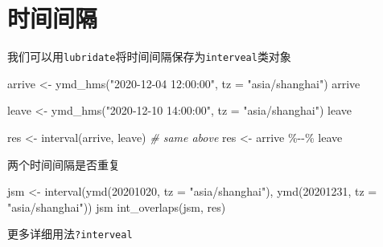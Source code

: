 \documentclass[
]{book}
\newenvironment{Shaded}{\begin{snugshade}}{\end{snugshade}}
\newcommand{\AttributeTok}[1]{\textcolor[rgb]{0.77,0.63,0.00}{#1}}
\newcommand{\CommentTok}[1]{\textcolor[rgb]{0.56,0.35,0.01}{\textit{#1}}}
\newcommand{\DecValTok}[1]{\textcolor[rgb]{0.00,0.00,0.81}{#1}}
\newcommand{\FunctionTok}[1]{\textcolor[rgb]{0.00,0.00,0.00}{#1}}
\newcommand{\NormalTok}[1]{#1}
\newcommand{\OtherTok}[1]{\textcolor[rgb]{0.56,0.35,0.01}{#1}}
\newcommand{\SpecialCharTok}[1]{\textcolor[rgb]{0.00,0.00,0.00}{#1}}
\newcommand{\StringTok}[1]{\textcolor[rgb]{0.31,0.60,0.02}{#1}}
\begin{document}
\hypertarget{ux65f6ux95f4ux95f4ux9694}{%
\section{时间间隔}\label{ux65f6ux95f4ux95f4ux9694}}

我们可以用\texttt{lubridate}将时间间隔保存为\texttt{interveal}类对象

\begin{Shaded}
\begin{Highlighting}[]
\NormalTok{arrive }\OtherTok{\textless{}{-}} \FunctionTok{ymd\_hms}\NormalTok{(}\StringTok{"2020{-}12{-}04 12:00:00"}\NormalTok{, }\AttributeTok{tz =} \StringTok{"asia/shanghai"}\NormalTok{)}
\NormalTok{arrive}

\NormalTok{leave }\OtherTok{\textless{}{-}} \FunctionTok{ymd\_hms}\NormalTok{(}\StringTok{"2020{-}12{-}10 14:00:00"}\NormalTok{, }\AttributeTok{tz =} \StringTok{"asia/shanghai"}\NormalTok{)}
\NormalTok{leave}

\NormalTok{res }\OtherTok{\textless{}{-}} \FunctionTok{interval}\NormalTok{(arrive, leave) }
\CommentTok{\# same above}
\NormalTok{res }\OtherTok{\textless{}{-}}\NormalTok{ arrive }\SpecialCharTok{\%{-}{-}\%}\NormalTok{ leave}
\end{Highlighting}
\end{Shaded}

两个时间间隔是否重复

\begin{Shaded}
\begin{Highlighting}[]
\NormalTok{jsm }\OtherTok{\textless{}{-}} \FunctionTok{interval}\NormalTok{(}\FunctionTok{ymd}\NormalTok{(}\DecValTok{20201020}\NormalTok{, }\AttributeTok{tz =} \StringTok{"asia/shanghai"}\NormalTok{), }\FunctionTok{ymd}\NormalTok{(}\DecValTok{20201231}\NormalTok{, }\AttributeTok{tz =} \StringTok{"asia/shanghai"}\NormalTok{))}
\NormalTok{jsm}
\FunctionTok{int\_overlaps}\NormalTok{(jsm, res)}
\end{Highlighting}
\end{Shaded}

更多详细用法\texttt{?interveal}
\end{document}
